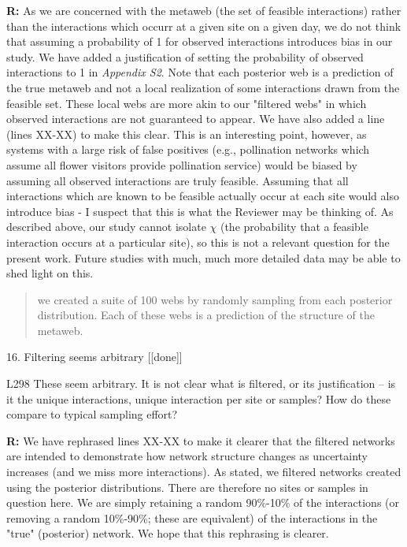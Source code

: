\documentclass[12pt]{letter}
\newenvironment{refquote}{\bigskip \begin{it}}{\end{it}\smallskip}
\begin{document}
\begin{itemize}
		\textbf{R:} As we are concerned with the metaweb (the set of feasible interactions) rather than the interactions which occurr at a given site on a given day, we do not think that assuming a probability of 1 for observed interactions introduces bias in our study. We have added a justification of setting the probability of observed interactions to 1 in \emph{Appendix S2}. Note that each posterior web is a prediction of the true metaweb and not a local realization of some interactions drawn from the feasible set. These local webs are more akin to our "filtered webs" in which observed interactions are not guaranteed to appear. We have also added a line (lines XX-XX) to make this clear.
		\medskip
		This is an interesting point, however, as systems with a large risk of false positives (e.g., pollination networks which assume all flower visitors provide pollination service) would be biased by assuming all observed interactions are truly feasible. Assuming that all interactions which are known to be feasible actually occur at each site would also introduce bias - I suspect that this is what the Reviewer may be thinking of. As described above, our study cannot isolate $\chi$ (the probability that a feasible interaction occurs at a particular site), so this is not a relevant question for the present work. Future studies with much, much more detailed data may be able to shed light on this.

		\begin{quotation}
			we created a suite of 100 webs by randomly sampling from each posterior distribution. Each of these webs is a prediction of the structure of the metaweb.
		\end{quotation}


	16. Filtering seems arbitrary [[done]]

		\begin{refquote}
		L298 These seem arbitrary. It is not clear what is filtered, or its justification – is it the unique interactions, unique interaction per site or samples? How do these compare to typical sampling effort?
		\end{refquote}

		\textbf{R:} We have rephrased lines XX-XX to make it clearer that the filtered networks are intended to demonstrate how network structure changes as uncertainty increases (and we miss more interactions). As stated, we filtered networks created using the posterior distributions. There are therefore no sites or samples in question here. We are simply retaining a random 90\%-10\% of the interactions (or removing a random 10\%-90\%; these are equivalent) of the interactions in the "true" (posterior) network. We hope that this rephrasing is clearer. 


\end{itemize}
\end{document}
